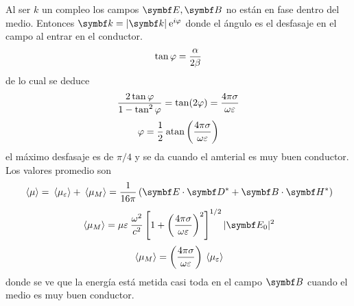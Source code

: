 \documentclass[10pt,oneside]{CBFT_book}
\begin{document}
Al ser $k$ un compleo los campos $\vb{E}, \vb{B}$ no están en fase dentro del medio. Entonces
$ \vb{k} = |\vb{k}| \euler^{i \vp} $ donde el ángulo es el desfasaje en el campo al entrar en el
conductor.
\[
	\tan \varphi = \frac{\alpha}{2\beta}
\]
de lo cual se deduce
\[
	\frac{2 \tan \varphi }{1 - \tan^2 \varphi} = \tan (2\varphi) = 
	\frac{4 \pi \sigma }{\omega \varepsilon }
\]
\[
	\varphi = \frac{1}{2} \:\mathrm{ atan }\left( \frac{ 4\pi\sigma }{ \omega\varepsilon } \right)
\]
el máximo desfasaje es de $ \pi /4 $ y se da cuando el amterial es muy buen conductor.
Los valores promedio son
\[
	\vm{\mu} = \vm{\mu_\varepsilon} + \vm{\mu_M} = \frac{1}{16\pi}
	\left( \vb{E}\cdot\vb{D}^* + \vb{B}\cdot\vb{H}^* \right)
\]
\[
	\vm{\mu_M} = \mu\varepsilon \:\frac{\omega^2}{c^2} 
	\left[ 1 + \Frac{4\pi\sigma}{\omega\varepsilon}^2 \right]^{1/2} |\vb{E}_0|^2
\]
\[
	\:\langle \mu_M \rangle = \left( \frac{ 4\pi\sigma }{ \omega\varepsilon } \right) \:\langle \mu_\varepsilon \rangle
\]
donde se ve que la energía está metida casi toda en el campo $\vb{B}$ cuando el medio es muy buen
conductor.

\end{document}
